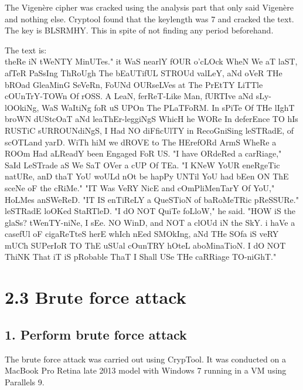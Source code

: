 The Vigenère cipher was cracked using the analysis part that only said Vigenère and nothing else.
Cryptool found that the keylength was 7 and cracked the text.
The key is BLSRMHY.
This in spite of not finding any period beforehand.

The text is: \\
theRe iN tWeNTY MinUTes."
it WaS nearlY fOUR o'cLOck WheN We aT laST, afTeR PaSsIng ThRoUgh
The bEaUTifUL STROUd valLeY, aNd oVeR THe bROad GleaMinG SeVeRn,
FoUNd OURseLVes at The PrEtTY LiTTle cOUnTrY-TOWn Of rOSS. A
LeaN, ferReT-Like Man, fURTIve aNd sLy-lOOkiNg, WaS WaItiNg foR
uS UPOn The PLaTFoRM. In sPiTe Of THe lIghT broWN dUStcOaT aNd
leaThEr-leggiNgS WhicH he WORe In deferEnce TO hIs RUSTiC
sURROUNdiNgS, I Had NO diFficUlTY in RecoGniSing leSTRadE, of
scOTLand yarD. WiTh hiM we dROVE to The HErefORd ArmS WheRe a
ROOm Had aLReadY been Engaged FoR US.
"I have ORdeRed a carRiage," SaId LeSTrade aS We SaT OVer a cUP
Of TEa. "I KNeW YoUR eneRgeTic natURe, anD thaT YoU woULd nOt be
hapPy UNTil YoU had bEen ON ThE sceNe oF the cRiMe."
"IT Was VeRY NicE and cOmPliMenTarY Of YoU," HoLMes anSWeReD. "IT
IS enTiReLY a QueSTioN of baRoMeTRic pReSSURe."
leSTRadE loOKed StaRTleD. "I dO NOT QuiTe foLloW," he said.
"HOW iS the glaSs? tWenTY-niNe, I sEe. NO WinD, and NOT a clOUd
iN the SkY. i haVe a casefUl oF cigaReTteS herE whIch nEed
SMOkIng, aNd THe SOfa iS veRY mUCh SUPerIoR TO ThE uSUal cOunTRY
hOteL aboMinaTioN. I dO NOT ThiNK That iT iS pRobable ThaT I
Shall USe THe caRRiage TO-niGhT."

\section*{2.3 Brute force attack}

\subsection*{1. Perform brute force attack}

The brute force attack was carried out using CrypTool.
It was conducted on a MacBook Pro Retina late 2013 model with Windows 7 running in a VM using Parallels 9.

